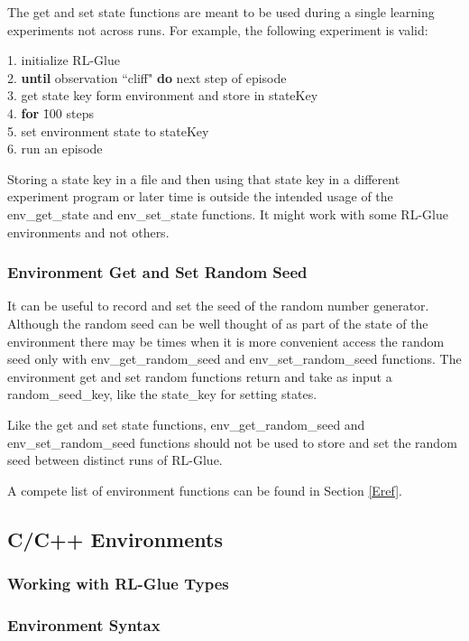 \documentclass[11pt]{article}
\begin{document}
The get and set state functions are meant to be used during a single learning experiments not across runs. For example, the following experiment is valid:
\begin{tabbing}
1. initialize RL-Glue\\
2. {\bf until} observation ``cliff" {\bf do} next step of episode\\
3. get state key form environment and store in stateKey\\
4. {\bf for} \=100 steps\\
5. \> set environment state to stateKey\\
6. \> run an episode
\end{tabbing}
Storing a state key in a file and then using that state key in a different experiment program or later time is outside the intended usage of the env\_get\_state and env\_set\_state functions. It might work with some RL-Glue environments and not others.
        
\subsubsection{Environment Get and Set Random Seed}
It can be useful to record and set the seed of the random number generator. Although the random seed can be well thought of as part of the state of the environment there may be times when it is more convenient access the random seed only with env\_get\_random\_seed and env\_set\_random\_seed functions. The environment get and set random functions return and take as input a random\_seed\_key, like the state\_key for setting states. 

Like the get and set state functions, env\_get\_random\_seed and env\_set\_random\_seed functions should not be used to store and set the random seed between distinct runs of RL-Glue.

A compete list of environment functions can be found in Section \ref{Eref}.

\subsection{C/C++ Environments}
\label{envp3}

\subsubsection{Working with RL-Glue Types}

\subsubsection{Environment Syntax}
\end{document}
